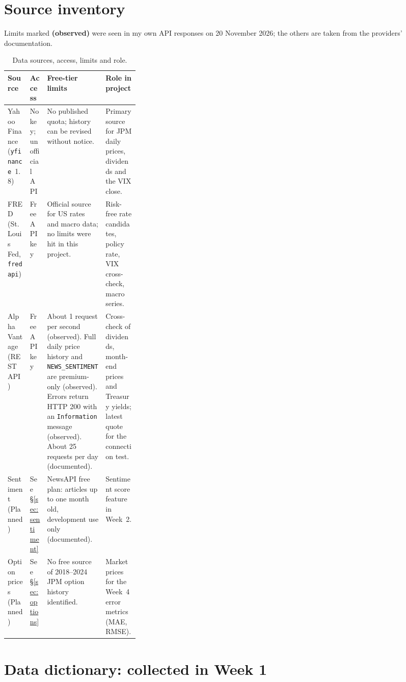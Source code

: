 \documentclass[11pt]{article}
\newcommand{\code}[1]{\texttt{#1}}
\begin{document}
\section{Source inventory}
Limits marked \textbf{(observed)} were seen in my own API responses on 20 November 2026; the others are taken from
the providers' documentation.

\begin{table}[H]
\centering\small
\caption{Data sources, access, limits and role.}
\begin{tabularx}{\linewidth}{@{}>{\raggedright\arraybackslash}p{0.17\linewidth}>{\raggedright\arraybackslash}p{0.13\linewidth}LL@{}}
\toprule
Source & Access & Free-tier limits & Role in project \\
\midrule
Yahoo Finance (\code{yfinance}~1.8) & No key; unofficial API & No published quota; history can be revised without notice. & Primary source for JPM daily prices, dividends and the VIX close. \\
FRED (St.~Louis Fed, \code{fredapi}) & Free API key & Official source for US rates and macro data; no limits were hit in this project. & Risk-free rate candidates, policy rate, VIX cross-check, macro series. \\
Alpha Vantage (REST API) & Free API key & About 1 request per second (observed). Full daily price history and \code{NEWS\_SENTIMENT} are premium-only (observed). Errors return HTTP 200 with an \code{Information} message (observed). About 25 requests per day (documented). & Cross-check of dividends, month-end prices and Treasury yields; latest quote for the connection test. \\
Sentiment (Planned) & See \S\ref{sec:sentiment} & NewsAPI free plan: articles up to one month old, development use only (documented). & Sentiment score feature in Week~2. \\
Option prices (Planned) & See \S\ref{sec:options} & No free source of 2018--2024 JPM option history identified. & Market prices for the Week~4 error metrics (MAE, RMSE). \\
\bottomrule
\end{tabularx}
\end{table}

\section{Data dictionary: collected in Week 1}
\end{document}
